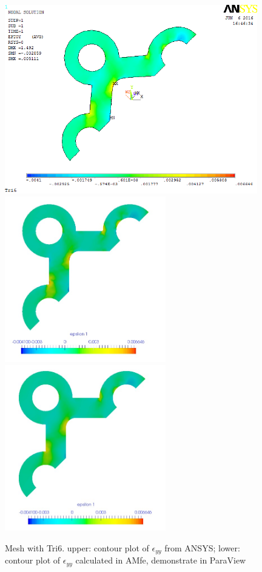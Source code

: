 \begin{figure}[htbp]
	\begin{center}
		\includegraphics[width=11cm,clip]{Tri6_Eyy.png} 
		\includegraphics[width=7cm,clip]{Tri6_Eyy_PD.png} 		
		\includegraphics[width=7cm,clip]{Tri6_Eyy_P.png} 		
		\caption{Mesh with Tri6. upper: contour plot of $\epsilon_{yy}$ from ANSYS; lower: contour plot of $\epsilon_{yy}$ calculated in AMfe, demonstrate in ParaView} \label{fig: Tri6_Eyy}
	\end{center}
\end{figure}
\clearpage 

